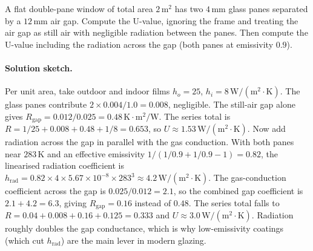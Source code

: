 \begin{exercise}
A flat double-pane window of total area $2\,\text{m}^2$ has two
$4\,\si{\milli\meter}$ glass panes separated by a $12\,\si{\milli\meter}$
air gap. Compute the U-value, ignoring the frame and treating the
air gap as still air with negligible radiation between the panes.
Then compute the U-value including the radiation across the gap (both
panes at emissivity $0.9$).
\paragraph{Solution sketch.} Per unit area, take outdoor and indoor
films $h_o = 25$, $h_i = 8\,\text{W}/(\text{m}^2\cdot\si{\kelvin})$.
The glass panes contribute $2 \times 0.004/1.0 = 0.008$, negligible.
The still-air gap alone gives $R_{\text{gap}} = 0.012/0.025 = 0.48\,
\si{\kelvin}\cdot\text{m}^2/\text{W}$. The series total is $R = 1/25 +
0.008 + 0.48 + 1/8 = 0.653$, so $U \approx 1.53\,\text{W}/(\text{m}^2
\cdot\si{\kelvin})$. Now add radiation across the gap in parallel with
the gas conduction. With both panes near $283\,\si{\kelvin}$ and an
effective emissivity $1/(1/0.9 + 1/0.9 - 1) = 0.82$, the linearised
radiation coefficient is $h_{\text{rad}} = 0.82 \times 4 \times
5.67\times10^{-8} \times 283^3 \approx 4.2\,\text{W}/(\text{m}^2\cdot
\si{\kelvin})$. The gas-conduction coefficient across the gap is
$0.025/0.012 = 2.1$, so the combined gap coefficient is $2.1 + 4.2 =
6.3$, giving $R_{\text{gap}} = 0.16$ instead of $0.48$. The series
total falls to $R = 0.04 + 0.008 + 0.16 + 0.125 = 0.333$ and $U
\approx 3.0\,\text{W}/(\text{m}^2\cdot\si{\kelvin})$. Radiation roughly
doubles the gap conductance, which is why low-emissivity coatings (which
cut $h_{\text{rad}}$) are the main lever in modern glazing.
\end{exercise}

